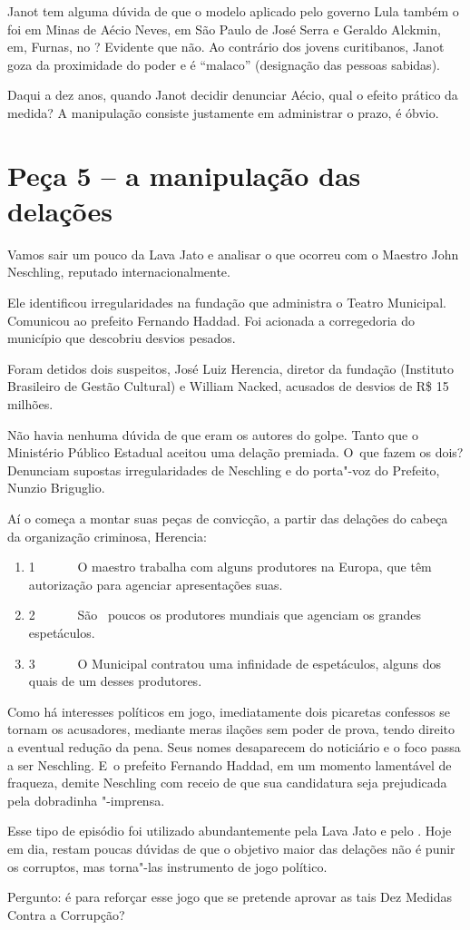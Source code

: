 Janot tem alguma dúvida de que o modelo aplicado pelo governo Lula
também o foi em Minas de Aécio Neves, em São Paulo de José Serra e
Geraldo Alckmin, em, Furnas, no ? Evidente que não. Ao contrário dos
jovens curitibanos, Janot goza da proximidade do poder e é ``malaco''
(designação das pessoas sabidas).

Daqui a dez anos, quando Janot decidir denunciar Aécio, qual o efeito
prático da medida? A manipulação consiste justamente em administrar o
prazo, é óbvio.

\section{Peça 5 -- a manipulação das delações}

Vamos sair um pouco da Lava Jato e analisar o que ocorreu com o Maestro
John Neschling, reputado internacionalmente.

Ele identificou irregularidades na fundação que administra o Teatro
Municipal. Comunicou ao prefeito Fernando Haddad. Foi acionada a
corregedoria do município que descobriu desvios pesados.

Foram detidos dois suspeitos, José Luiz Herencia, diretor da fundação
 (Instituto Brasileiro de Gestão Cultural) e William Nacked,
acusados de desvios de R\$ 15 milhões.

Não havia nenhuma dúvida de que eram os autores do golpe. Tanto que o
Ministério Público Estadual aceitou uma delação premiada. O~que fazem os
dois? Denunciam supostas irregularidades de Neschling e do porta"-voz do
Prefeito, Nunzio Briguglio.

Aí o  começa a montar suas peças de convicção, a partir das delações
do cabeça da organização criminosa, Herencia:

\begin{enumerate}
\itemsep1pt\parskip0pt
\item
  1~~~~~~ O maestro trabalha com alguns produtores na Europa, que têm
  autorização para agenciar apresentações suas.
\item
  2~~~~~~ São ~poucos os produtores mundiais que agenciam os grandes
  espetáculos.
\item
  3~~~~~~ O Municipal contratou uma infinidade de espetáculos, alguns
  dos quais de um desses produtores.
\end{enumerate}

Como há interesses políticos em jogo, imediatamente dois picaretas
confessos se tornam os acusadores, mediante meras ilações sem poder de
prova, tendo direito a eventual redução da pena. Seus nomes desaparecem
do noticiário e o foco passa a ser Neschling. E~o prefeito Fernando
Haddad, em um momento lamentável de fraqueza, demite Neschling com
receio de que sua candidatura seja prejudicada pela dobradinha
"-imprensa.

Esse tipo de episódio foi utilizado abundantemente pela Lava Jato e pelo
. Hoje em dia, restam poucas dúvidas de que o objetivo maior das
delações não é punir os corruptos, mas torna"-las instrumento de jogo
político.

Pergunto: é para reforçar esse jogo que se pretende aprovar as tais Dez
Medidas Contra a Corrupção?

